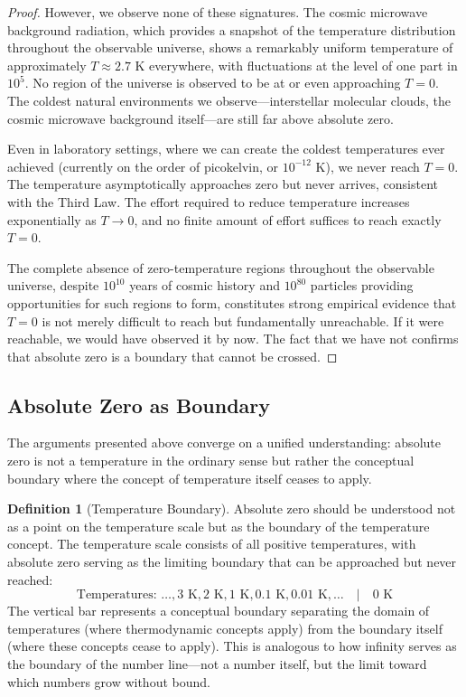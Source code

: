 \documentclass[12pt,a4paper]{article}
\theoremstyle{definition}
\newtheorem{definition}[theorem]{Definition}
\theoremstyle{remark}
\begin{document}
\begin{proof}
However, we observe none of these signatures. The cosmic microwave background radiation, which provides a snapshot of the temperature distribution throughout the observable universe, shows a remarkably uniform temperature of approximately $T \approx 2.7$ K everywhere, with fluctuations at the level of one part in $10^5$. No region of the universe is observed to be at or even approaching $T = 0$. The coldest natural environments we observe—interstellar molecular clouds, the cosmic microwave background itself—are still far above absolute zero.

Even in laboratory settings, where we can create the coldest temperatures ever achieved (currently on the order of picokelvin, or $10^{-12}$ K), we never reach $T = 0$. The temperature asymptotically approaches zero but never arrives, consistent with the Third Law. The effort required to reduce temperature increases exponentially as $T \to 0$, and no finite amount of effort suffices to reach exactly $T = 0$.

The complete absence of zero-temperature regions throughout the observable universe, despite $10^{10}$ years of cosmic history and $10^{80}$ particles providing opportunities for such regions to form, constitutes strong empirical evidence that $T = 0$ is not merely difficult to reach but fundamentally unreachable. If it were reachable, we would have observed it by now. The fact that we have not confirms that absolute zero is a boundary that cannot be crossed.
\end{proof}

\subsection{Absolute Zero as Boundary}

The arguments presented above converge on a unified understanding: absolute zero is not a temperature in the ordinary sense but rather the conceptual boundary where the concept of temperature itself ceases to apply.

\begin{definition}[Temperature Boundary]
Absolute zero should be understood not as a point on the temperature scale but as the boundary of the temperature concept. The temperature scale consists of all positive temperatures, with absolute zero serving as the limiting boundary that can be approached but never reached:
\begin{equation}
\text{Temperatures: } \ldots, 3\text{ K}, 2\text{ K}, 1\text{ K}, 0.1\text{ K}, 0.01\text{ K}, \ldots \quad \bigg| \quad 0\text{ K}
\end{equation}
The vertical bar represents a conceptual boundary separating the domain of temperatures (where thermodynamic concepts apply) from the boundary itself (where these concepts cease to apply). This is analogous to how infinity serves as the boundary of the number line—not a number itself, but the limit toward which numbers grow without bound.
\end{definition}
\end{document}

